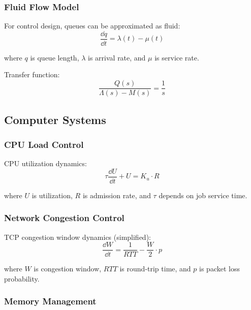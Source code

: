 

\subsubsection{Fluid Flow Model}

For control design, queues can be approximated as fluid:
\begin{equation}
\frac{\dd q}{\dd t} = \lambda(t) - \mu(t)
\end{equation}

where $q$ is queue length, $\lambda$ is arrival rate, and $\mu$ is service rate.

Transfer function:
\begin{equation}
\frac{Q(s)}{\Lambda(s) - M(s)} = \frac{1}{s}
\end{equation}

\subsection{Computer Systems}
\label{subsec:computer_systems}

\subsubsection{CPU Load Control}

CPU utilization dynamics:
\begin{equation}
\tau\frac{\dd U}{\dd t} + U = K_u \cdot R
\end{equation}

where $U$ is utilization, $R$ is admission rate, and $\tau$ depends on job service time.

\subsubsection{Network Congestion Control}

TCP congestion window dynamics (simplified):
\begin{equation}
\frac{\dd W}{\dd t} = \frac{1}{RTT} - \frac{W}{2} \cdot p
\end{equation}

where $W$ is congestion window, $RTT$ is round-trip time, and $p$ is packet loss probability.

\subsubsection{Memory Management}

